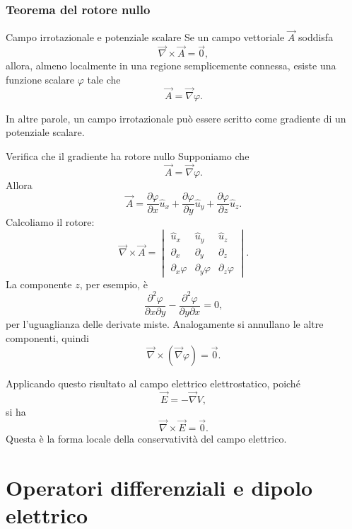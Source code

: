 \documentclass[a4paper]{article}
\begin{document}
\section{Teorema del rotore nullo}

\begin{snippettheorem}{Campo irrotazionale e potenziale scalare}
    Se un campo vettoriale \(\vec{A}\) soddisfa
    \[
        \vec{\nabla}\times\vec{A}=\vec{0},
    \]
    allora, almeno localmente in una regione semplicemente connessa, esiste una funzione scalare \(\varphi\) tale che
    \[
        \vec{A}=\vec{\nabla}\varphi.
    \]
\end{snippettheorem}

In altre parole, un campo irrotazionale può essere scritto come gradiente di un potenziale scalare.

\begin{snippetproof}{Verifica che il gradiente ha rotore nullo}
    Supponiamo che
    \[
        \vec{A}=\vec{\nabla}\varphi.
    \]
    Allora
    \[
        \vec{A}=\frac{\partial\varphi}{\partial x}\hat{u}_x+\frac{\partial\varphi}{\partial y}\hat{u}_y+\frac{\partial\varphi}{\partial z}\hat{u}_z.
    \]
    Calcoliamo il rotore:
    \[
        \vec{\nabla}\times\vec{A}
        =
        \begin{vmatrix}
            \hat{u}_x & \hat{u}_y & \hat{u}_z \\
            \partial_x & \partial_y & \partial_z \\
            \partial_x\varphi & \partial_y\varphi & \partial_z\varphi
        \end{vmatrix}.
    \]
    La componente \(z\), per esempio, è
    \[
        \frac{\partial^2\varphi}{\partial x\partial y}
        -\frac{\partial^2\varphi}{\partial y\partial x}=0,
    \]
    per l'uguaglianza delle derivate miste. Analogamente si annullano le altre componenti, quindi
    \[
        \vec{\nabla}\times\left(\vec{\nabla}\varphi\right)=\vec{0}.
    \]
\end{snippetproof}

Applicando questo risultato al campo elettrico elettrostatico, poiché
\[
    \vec{E}=-\vec{\nabla}V,
\]
si ha
\[
    \vec{\nabla}\times\vec{E}=\vec{0}.
\]
Questa è la forma locale della conservatività del campo elettrico.

\pagebreak
\part{Operatori differenziali e dipolo elettrico}
\end{document}
